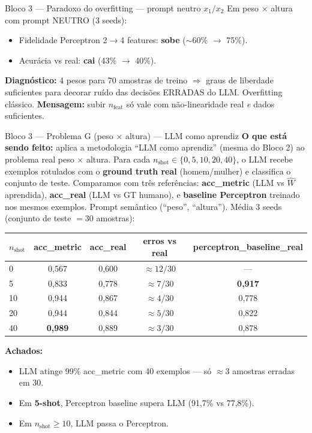 \documentclass[aspectratio=169,10pt]{beamer}
\begin{document}
\begin{frame}{Bloco 3 --- Paradoxo do overfitting --- prompt neutro $x_1/x_2$}
  \footnotesize
  Em peso $\times$ altura com prompt NEUTRO (3 seeds):
  \begin{itemize}
    \item Fidelidade Perceptron 2$\to$4 features: \textbf{sobe} ($\sim$60\% $\to$ 75\%).
    \item Acur\'acia vs real: \textbf{cai} (43\% $\to$ 40\%).
  \end{itemize}
  \medskip
  \textbf{Diagn\'ostico:} 4 pesos para 70 amostras de treino $\Rightarrow$ graus de liberdade suficientes para decorar ru\'ido das decis\~oes ERRADAS do LLM. Overfitting cl\'assico.
  \medskip
  \textbf{Mensagem:} subir $n_{\text{feat}}$ s\'o vale com n\~ao-linearidade real \emph{e} dados suficientes.
\end{frame}

\begin{frame}{Bloco 3 --- Problema G (peso $\times$ altura) --- LLM como aprendiz}
  \scriptsize
  \textbf{O que est\'a sendo feito:} aplica a metodologia ``LLM como aprendiz'' (mesma do Bloco 2) ao problema real peso $\times$ altura. Para cada $n_{\text{shot}} \in \{0, 5, 10, 20, 40\}$, o LLM recebe exemplos rotulados com o \textbf{ground truth real} (homem/mulher) e classifica o conjunto de teste. Comparamos com tr\^es refer\^encias: \textbf{acc\_metric} (LLM vs $\hat W$ aprendida), \textbf{acc\_real} (LLM vs GT humano), e \textbf{baseline Perceptron} treinado nos mesmos exemplos. Prompt sem\^antico (``peso'', ``altura'').
  \medskip
  M\'edia 3 seeds (conjunto de teste $= 30$ amostras):
  \begin{center}
  \begin{tabular}{lcccc}
    \toprule
    $n_{\text{shot}}$ & acc\_metric & acc\_real & \textbf{erros vs real} & perceptron\_baseline\_real \\
    \midrule
    0  & 0{,}567 & 0{,}600 & $\approx 12/30$ & --- \\
    5  & 0{,}833 & 0{,}778 & $\approx 7/30$ & \textbf{0{,}917} \\
    10 & 0{,}944 & 0{,}867 & $\approx 4/30$ & 0{,}778 \\
    20 & 0{,}944 & 0{,}844 & $\approx 5/30$ & 0{,}822 \\
    40 & \textbf{0{,}989} & 0{,}889 & $\approx 3/30$ & 0{,}878 \\
    \bottomrule
  \end{tabular}
  \end{center}
  \textbf{Achados:}
  \begin{itemize}
    \item LLM atinge 99\% acc\_metric com 40 exemplos --- s\'o $\approx 3$ amostras erradas em 30.
    \item Em \textbf{5-shot}, Perceptron baseline supera LLM (91,7\% vs 77,8\%).
    \item Em $n_{\text{shot}} \geq 10$, LLM passa o Perceptron.
  \end{itemize}
\end{frame}
\end{document}
